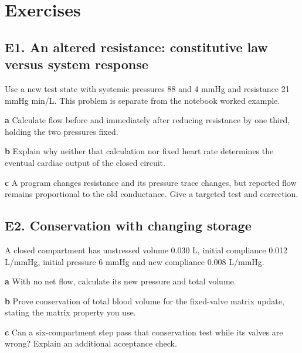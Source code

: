 \documentclass[11pt,letterpaper]{article}
\theoremstyle{definition}\newtheorem{definition}{Definition}\newtheorem{example}{Example}
\numberwithin{equation}{section}
\begin{document}
\section*{Exercises}
\par\noindent\begin{minipage}{\linewidth}
\subsection*{E1. An altered resistance: constitutive law versus system response}
Use a new test state with systemic pressures 88 and 4 mmHg and resistance 21 mmHg min/L. This problem is separate from the notebook worked example.

\textbf{a} Calculate flow before and immediately after reducing resistance by one third, holding the two pressures fixed.

\end{minipage}\par\medskip
\textbf{b} Explain why neither that calculation nor fixed heart rate determines the eventual cardiac output of the closed circuit.

\textbf{c} A program changes resistance and its pressure trace changes, but reported flow remains proportional to the old conductance. Give a targeted test and correction.

\par\noindent\begin{minipage}{\linewidth}
\subsection*{E2. Conservation with changing storage}
A closed compartment has unstressed volume 0.030 L, initial compliance 0.012 L/mmHg, initial pressure 6 mmHg and new compliance 0.008 L/mmHg.

\textbf{a} With no net flow, calculate its new pressure and total volume.

\end{minipage}\par\medskip
\textbf{b} Prove conservation of total blood volume for the fixed-valve matrix update, stating the matrix property you use.

\textbf{c} Can a six-compartment step pass that conservation test while its valves are wrong? Explain an additional acceptance check.
\end{document}
